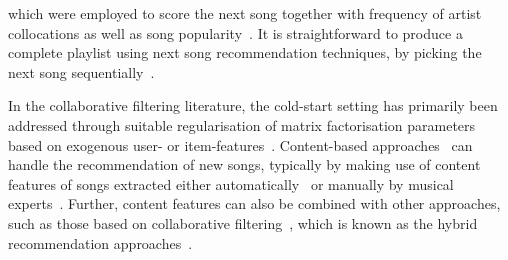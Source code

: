 which were employed to score the next song together with frequency of artist collocations
as well as song popularity~\cite{mcfee2012million,bonnin2013evaluating}.
It is straightforward to produce a complete playlist using next song recommendation techniques,
\ie by picking the next song sequentially~\cite{bonnin2013evaluating,ben2017groove}.
%


In the collaborative filtering literature,
the cold-start setting has primarily been addressed through
suitable regularisation of matrix factorisation parameters
based on exogenous user- or item-features~\cite{Ma:2008,Agarwal:2009,Cao:2010}.
%
Content-based approaches~\cite[chap. 4]{aggarwal2016recommender}
can handle the recommendation of new songs,
typically by making use of content features of songs extracted either automatically~\cite{seyerlehner2010automatic,eghbal2015vectors}
or manually by musical experts~\cite{john2006pandora}.
Further, content features can also be combined with other approaches, such as those based on 
collaborative filtering~\cite{yoshii2006hybrid,donaldson2007hybrid,shao2009music},
which is known as the hybrid recommendation approaches~\cite{burke2002hybrid,aggarwal2016recommender}.
%


